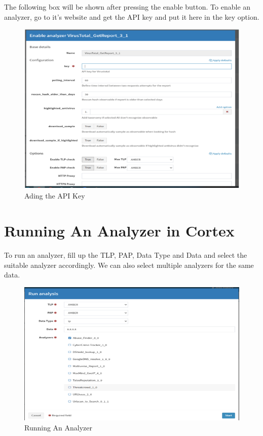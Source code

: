 \documentclass{book}
\begin{document}
The following box will be shown after pressing the enable button. To enable
an analyzer, go to it’s website and get the API key and put it here in the
key option.

\begin{figure}[htbp]
    \centering
    \includegraphics[width=1\linewidth]{cortex_images/image.png}
    \caption{Ading the API Key}
    \label{fig:Ading the API Key}
\end{figure}

\newpage

\section{Running An Analyzer in Cortex}
To run an analyzer, fill up the TLP, PAP, Data Type and Data and select
the suitable analyzer accordingly. We can also select multiple analyzers for
the same data.

\begin{figure}[htbp]
    \centering
    \includegraphics[width=1\linewidth]{image.png}
    \caption{Running An Analyzer}
    \label{fig:Running An Analyzer}
\end{figure}
\end{document}
